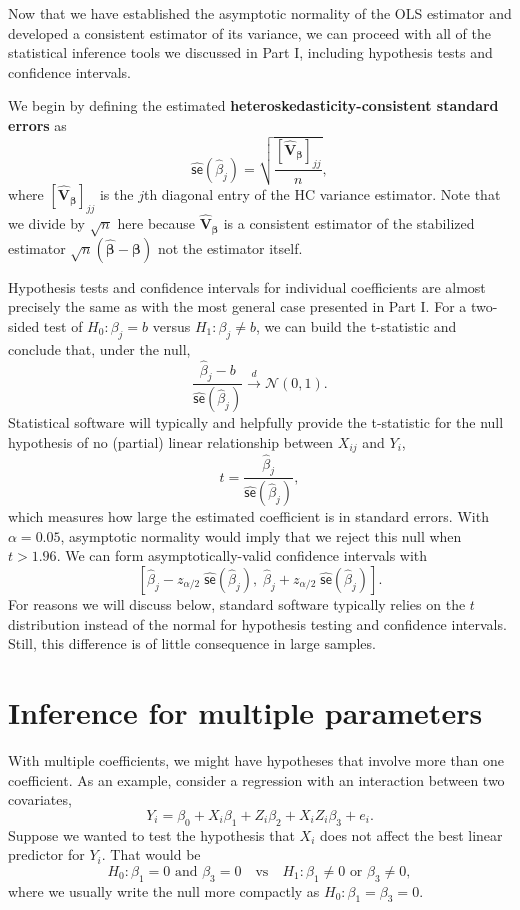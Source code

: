 \documentclass[
  13pt,
  letterpaper,
  DIV=11,
  numbers=noendperiod]{scrreprt}
\newcommand{\mb}{\bm}
\newcommand{\N}{\mathcal{N}}
\newcommand{\se}{\textsf{se}}
\newcommand{\bfbeta}{\mb{\beta}}
\newcommand{\bhat}{\widehat{\mb{\beta}}}
\newcommand{\indist}{\overset{d}{\to}}
\theoremstyle{plain}
\theoremstyle{plain}
\theoremstyle{definition}
\theoremstyle{definition}
\theoremstyle{remark}
\begin{document}
Now that we have established the asymptotic normality of the OLS
estimator and developed a consistent estimator of its variance, we can
proceed with all of the statistical inference tools we discussed in Part
I, including hypothesis tests and confidence intervals.

We begin by defining the estimated \textbf{heteroskedasticity-consistent
standard errors} as \[ 
\widehat{\se}(\widehat{\beta}_{j}) = \sqrt{\frac{[\widehat{\mb{V}}_{\bfbeta}]_{jj}}{n}},
\] where \([\widehat{\mb{V}}_{\bfbeta}]_{jj}\) is the \(j\)th diagonal
entry of the HC variance estimator. Note that we divide by \(\sqrt{n}\)
here because \(\widehat{\mb{V}}_{\bfbeta}\) is a consistent estimator of
the stabilized estimator \(\sqrt{n}(\bhat - \bfbeta)\) not the estimator
itself.

Hypothesis tests and confidence intervals for individual coefficients
are almost precisely the same as with the most general case presented in
Part I. For a two-sided test of \(H_0: \beta_j = b\) versus
\(H_1: \beta_j \neq b\), we can build the t-statistic and conclude that,
under the null, \[
\frac{\widehat{\beta}_j - b}{\widehat{\se}(\widehat{\beta}_{j})} \indist \N(0, 1).
\] Statistical software will typically and helpfully provide the
t-statistic for the null hypothesis of no (partial) linear relationship
between \(X_{ij}\) and \(Y_i\), \[ 
t = \frac{\widehat{\beta}_{j}}{\widehat{\se}(\widehat{\beta}_{j})},
\] which measures how large the estimated coefficient is in standard
errors. With \(\alpha = 0.05\), asymptotic normality would imply that we
reject this null when \(t > 1.96\). We can form asymptotically-valid
confidence intervals with \[ 
\left[\widehat{\beta}_{j} - z_{\alpha/2}\;\widehat{\se}(\widehat{\beta}_{j}),\;\widehat{\beta}_{j} + z_{\alpha/2}\;\widehat{\se}(\widehat{\beta}_{j})\right]. 
\] For reasons we will discuss below, standard software typically relies
on the \(t\) distribution instead of the normal for hypothesis testing
and confidence intervals. Still, this difference is of little
consequence in large samples.

\section{Inference for multiple
parameters}\label{inference-for-multiple-parameters}

With multiple coefficients, we might have hypotheses that involve more
than one coefficient. As an example, consider a regression with an
interaction between two covariates, \[
Y_i = \beta_0 + X_i\beta_1 + Z_i\beta_2 + X_iZ_i\beta_3 + e_i.
\] Suppose we wanted to test the hypothesis that \(X_i\) does not affect
the best linear predictor for \(Y_i\). That would be \[ 
H_{0}: \beta_{1} = 0 \text{ and } \beta_{3} = 0\quad\text{vs}\quad H_{1}: \beta_{1} \neq 0 \text{ or } \beta_{3} \neq 0,
\] where we usually write the null more compactly as
\(H_0: \beta_1 = \beta_3 = 0\).
\end{document}
